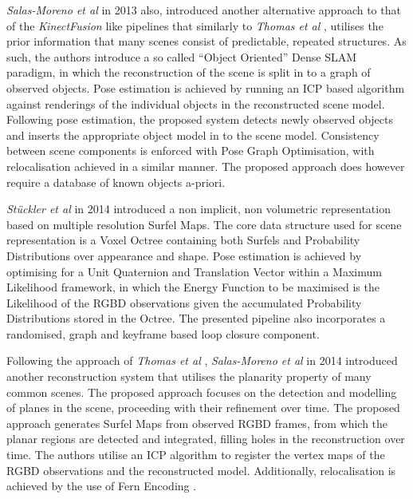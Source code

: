 \textit{Salas-Moreno et al} \cite{Salas-Moreno2013} in 2013 also, introduced another alternative 
approach to that of the \textit{KinectFusion} \cite{Newcombe2011} like pipelines that similarly to 
\textit{Thomas et al} \cite{Thomas2013}, utilises the prior information that many scenes consist 
of predictable, repeated structures. As such, the authors introduce a so called ``Object Oriented'' 
Dense SLAM paradigm, in which the reconstruction of the scene is split in to a graph of observed 
objects. Pose estimation is achieved by running an ICP based algorithm against renderings of the 
individual objects in the reconstructed scene model. Following pose estimation, the proposed 
system detects newly observed objects and inserts the appropriate object model in to the scene 
model. Consistency between scene components is enforced with Pose Graph Optimisation, with 
relocalisation achieved in a similar manner. The proposed approach does however require a 
database of known objects a-priori.

\textit{St{\"u}ckler et al} \cite{Stuckler2014} in 2014 introduced a non implicit, non volumetric 
representation based on multiple resolution Surfel \cite{Pfister2000} Maps. The core data structure 
used for scene representation is a Voxel Octree \cite{OCTREE} containing both Surfels and 
Probability Distributions over appearance and shape. Pose estimation is achieved by optimising for 
a Unit Quaternion \cite{QUAT} and Translation Vector within a Maximum Likelihood framework, in which 
the Energy Function to be maximised is the Likelihood of the RGBD observations given the accumulated 
Probability Distributions stored in the Octree. The presented pipeline also incorporates a randomised, 
graph and keyframe based loop closure component.

Following the approach of \textit{Thomas et al} \cite{Thomas2013}, \textit{Salas-Moreno et al} 
\cite{Salas-Moreno2014} in 2014 introduced another reconstruction system that utilises the
planarity property of many common scenes. The proposed approach focuses on the detection and 
modelling of planes in the scene, proceeding with their refinement over time. 
The proposed approach generates Surfel \cite{Pfister2000} Maps from observed RGBD frames, from 
which the planar regions are detected and integrated, filling holes in the reconstruction over time.
The authors utilise an ICP algorithm to register the vertex maps of the RGBD observations and the 
reconstructed model. Additionally, relocalisation is achieved by the use of Fern Encoding \cite{FERN}. 

